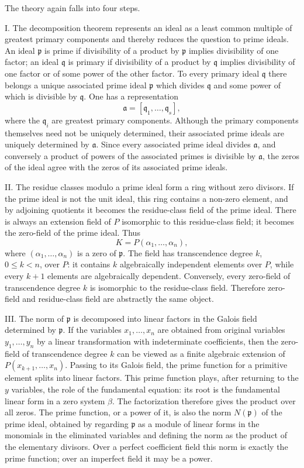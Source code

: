 \documentclass[11pt]{article}
\begin{document}
The theory again falls into four steps.

I. The decomposition theorem represents an ideal as a least common multiple of greatest primary components and thereby reduces the question to prime ideals. An ideal $\mathfrak p$ is prime if divisibility of a product by $\mathfrak p$ implies divisibility of one factor; an ideal $\mathfrak q$ is primary if divisibility of a product by $\mathfrak q$ implies divisibility of one factor or of some power of the other factor. To every primary ideal $\mathfrak q$ there belongs a unique associated prime ideal $\mathfrak p$ which divides $\mathfrak q$ and some power of which is divisible by $\mathfrak q$. One has a representation
\[
  \mathfrak a=[\mathfrak q_1,\ldots,\mathfrak q_s],
\]
where the $\mathfrak q_i$ are greatest primary components. Although the primary components themselves need not be uniquely determined, their associated prime ideals are uniquely determined by $\mathfrak a$. Since every associated prime ideal divides $\mathfrak a$, and conversely a product of powers of the associated primes is divisible by $\mathfrak a$, the zeros of the ideal agree with the zeros of its associated prime ideals.

II. The residue classes modulo a prime ideal form a ring without zero divisors. If the prime ideal is not the unit ideal, this ring contains a non-zero element, and by adjoining quotients it becomes the residue-class field of the prime ideal. There is always an extension field of $P$ isomorphic to this residue-class field; it becomes the zero-field of the prime ideal. Thus
\[
  K=P(\alpha_1,\ldots,\alpha_n),
\]
where $(\alpha_1,\ldots,\alpha_n)$ is a zero of $\mathfrak p$. The field has transcendence degree $k$, $0\leq k<n$, over $P$: it contains $k$ algebraically independent elements over $P$, while every $k+1$ elements are algebraically dependent. Conversely, every zero-field of transcendence degree $k$ is isomorphic to the residue-class field. Therefore zero-field and residue-class field are abstractly the same object.

III. The norm of $\mathfrak p$ is decomposed into linear factors in the Galois field determined by $\mathfrak p$. If the variables $x_1,\ldots,x_n$ are obtained from original variables $y_1,\ldots,y_n$ by a linear transformation with indeterminate coefficients, then the zero-field of transcendence degree $k$ can be viewed as a finite algebraic extension of $P(x_{k+1},\ldots,x_n)$. Passing to its Galois field, the prime function for a primitive element splits into linear factors. This prime function plays, after returning to the $y$ variables, the role of the fundamental equation: its root is the fundamental linear form in a zero system $\beta$. The factorization therefore gives the product over all zeros. The prime function, or a power of it, is also the norm $N(\mathfrak p)$ of the prime ideal, obtained by regarding $\mathfrak p$ as a module of linear forms in the monomials in the eliminated variables and defining the norm as the product of the elementary divisors. Over a perfect coefficient field this norm is exactly the prime function; over an imperfect field it may be a power.
\end{document}
